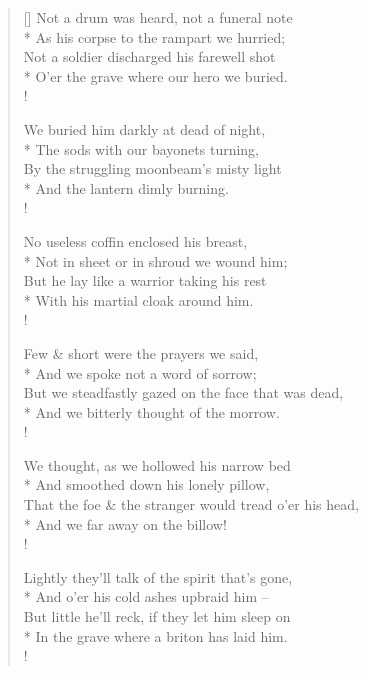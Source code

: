 \documentclass[MAIN]{subfiles}
\begin{document}
\settowidth{\versewidth}{Not a drum was heard, not a funeral note}
\begin{verse}[\versewidth]
Not a drum was heard, not a funeral note\\*
\vin As his corpse to the rampart we hurried;\\
Not a soldier discharged his farewell shot\\*
\vin O'er the grave where our hero we buried.\\!

We buried him darkly at dead of night,\\*
\vin The sods with our bayonets turning,\\
By the struggling moonbeam's misty light\\*
\vin And the lantern dimly burning.\\!

No useless coffin enclosed his breast,\\*
\vin Not in sheet or in shroud we wound him;\\
But he lay like a warrior taking his rest\\*
\vin With his martial cloak around him.\\!

Few \& short were the prayers we said,\\*
\vin And we spoke not a word of sorrow;\\
But we steadfastly gazed on the face that was dead,\\*
\vin And we bitterly thought of the morrow.\\!

We thought, as we hollowed his narrow bed\\*
\vin And smoothed down his lonely pillow,\\
That the foe \& the stranger would tread o'er his head,\\*
\vin And we far away on the billow!\\!

Lightly they'll talk of the spirit that's gone,\\*
\vin And o'er his cold ashes upbraid him --\\
But little he'll reck, if they let him sleep on\\*
\vin In the grave where a briton has laid him.\\!


\end{verse}
\end{document}
